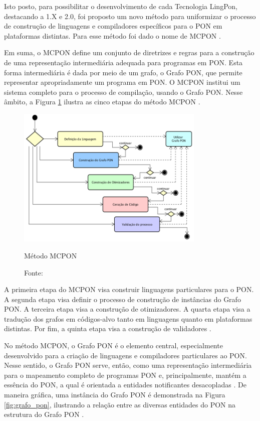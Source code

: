 Isto posto, para possibilitar o desenvolvimento de cada Tecnologia LingPon,
destacando a 1.X e 2.0, foi proposto um novo método para uniformizar o processo
de construção de linguagens e compiladores específicos para o PON em plataformas
distintas. Para esse método foi dado o nome de MCPON \cite{doc_ronszcka_2019}.

Em suma, o MCPON define um conjunto de diretrizes e regras para a construção de
uma representação intermediária adequada para programas em PON. Esta forma
intermediária é dada por meio de um grafo, o Grafo PON, que permite representar
apropriadamente um programa em PON. O MCPON institui um sistema completo para o
processo de compilação, usando o Grafo PON. Nesse âmbito, a Figura
\ref{fig:mcpon} ilustra as cinco etapas do método MCPON
\cite{doc_ronszcka_2019}.

\begin{figure}[!htb]
  \centering
  \includegraphics[width=0.8\textwidth]{../figures/metodo_mcpon.png}
  \smallskip
  \caption{Método MCPON}
  \caption*{Fonte: }
  \label{fig:mcpon}
\end{figure}

A primeira etapa do MCPON visa construir linguagens particulares para o PON. A
segunda etapa visa definir o processo de construção de instâncias do Grafo PON.
A terceira etapa visa a construção de otimizadores. A quarta etapa visa a
tradução dos grafos em códigos-alvo tanto em linguagens quanto em plataformas
distintas. Por fim, a quinta etapa visa a construção de validadores
\cite{doc_ronszcka_2019}.

No método MCPON, o Grafo PON é o elemento central, especialmente desenvolvido
para a criação de linguagens e compiladores particulares ao PON. Nesse sentido,
o Grafo PON serve, então, como uma representação intermediária para o mapeamento
completo de programas PON e, principalmente, mantém a essência do PON, a qual é
orientada a entidades notificantes desacopladas \cite{doc_ronszcka_2019}. De
maneira gráfica, uma instância do Grafo PON é demonstrada na Figura
\ref{fig:grafo_pon}, ilustrando a relação entre as diversas entidades do PON
na estrutura do Grafo PON \cite{msc_negrini_2019}.

